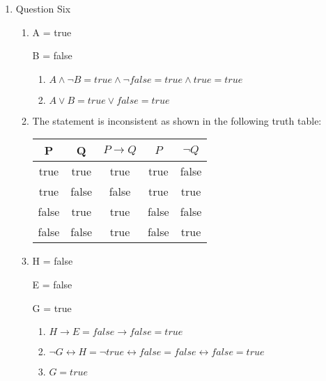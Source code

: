 \documentclass{article}
\begin{document}
\begin{enumerate}
\begin{enumerate}
    \end{enumerate}
    \item Question Six
    \begin{enumerate}
        \item
        A = true

        B = false
        \begin{enumerate}
            \item $A \land \neg B = true \land \neg false = true \land true = true$
            \item $A \lor B = true \lor false = true$
        \end{enumerate}
        \item
        The statement is inconsistent as shown in the following truth table:

        \begin{tabular}{| c | c | c | c | c |}
            \hline
            P & Q & $P \rightarrow Q$ & $P$ & $\neg Q$ \\
            \hline
            true & true & true & true & false \\
            \hline
            true & false & false & true & true \\
            \hline
            false & true & true & false & false \\
            \hline
            false & false & true & false & true \\
            \hline
        \end{tabular}
        \item
        H = false

        E = false

        G = true
        \begin{enumerate}
            \item $H \rightarrow E = false \rightarrow false = true$
            \item $\neg G \leftrightarrow H = \neg true \leftrightarrow false = false \leftrightarrow false = true$
            \item $G = true$
        \end{enumerate}
    \end{enumerate}
\end{enumerate}
\end{document}
